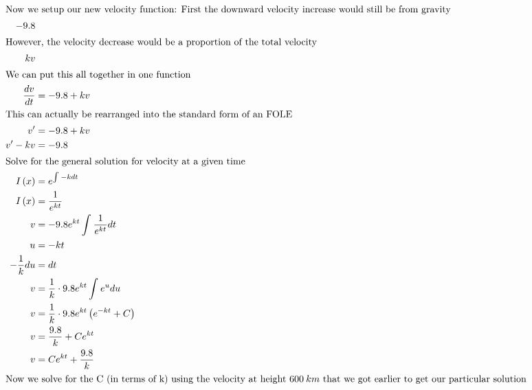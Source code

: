 \documentclass[12pt]{article}
\begin{document}
\begin{align}
  \intertext{Now we setup our new velocity function: First the downward velocity increase would still be from gravity}
  -9.8                                                                                                     \\
  \intertext{However, the velocity decrease would be a proportion of the total velocity}
  kv                                                                                                       \\
  \intertext{We can put this all together in one function}
  \frac{dv}{dt}           & =-9.8+kv                                                                       \\
  \intertext{This can actually be rearranged into the standard form of an FOLE}
  v'                      & =-9.8+kv                                                                       \\
  v'-kv                   & =-9.8                                                                          \\
  \intertext{Solve for the general solution for velocity at a given time}
  I\left(x\right)         & =e^{\int_{ }^{ }-kdt}                                                          \\
  I\left(x\right)         & =\frac{1}{e^{kt}}                                                              \\
  v                       & =-9.8e^{kt}\int_{ }^{ }\frac{1}{e^{kt}}dt                                      \\
  u                       & =-kt                                                                           \\
  -\frac{1}{k}du          & =dt                                                                            \\
  v                       & =\frac{1}{k}\cdot9.8e^{kt}\int_{ }^{ }e^{u}du                                  \\
  v                       & =\frac{1}{k}\cdot9.8e^{kt}\left(e^{-kt}+C\right)                               \\
  v                       & =\frac{9.8}{k}+Ce^{kt}                                                         \\
  v                       & =Ce^{kt}+\frac{9.8}{k}                                                         \\
  \intertext{Now we solve for the C (in terms of k) using the velocity at height $600\:km$ that we got earlier to get our particular solution}

\end{align}
\end{document}
